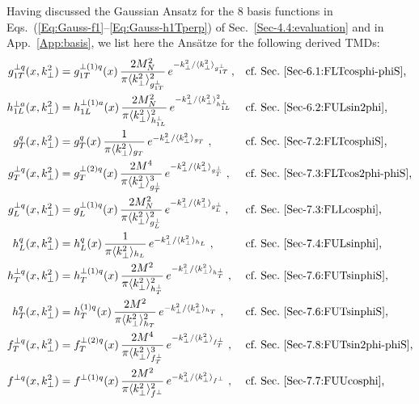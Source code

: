 \documentclass[a4paper,11pt]{article}
\newcommand{\la}{\langle}
\newcommand{\ra}{\rangle}
\def\kperp{k_\perp}
\def\avkperp{\la \kperp^2 \ra}
\begin{document}
Having discussed the Gaussian Ansatz for the 8 basis functions
in Eqs.~(\ref{Eq:Gauss-f1}--\ref{Eq:Gauss-h1Tperp}) of
Sec.~\ref{Sec-4.4:evaluation} and in App.~\ref{App:basis},
we list here the Ans\"atze for the following derived TMDs:
\begin{subequations}\begin{align}
	g_{1T}^{\perp q}(x,\kperp^2)
	  &=	g_{1T}^{\perp (1) q}(x)\,
		\frac{2 M_N^2}{\pi \avkperp_{g_{1T}^\perp}^2}\,
		e^{-\kperp^2/{\avkperp_{g_{1T}^\perp}}}  \,,
	  && 	\mbox{cf.\ Sec.~\ref{Sec-6.1:FLTcosphi-phiS},}
		\label{eq:g1t}\\
	h_{1L}^{\perp a}(x,\kperp^2)
	  &= 	h_{1L}^{\perp (1) a}(x)\,
		\frac{2 M_N^2}{\pi{\avkperp_{h_{1L}^\perp}^2}}\,
		e^{-\kperp^2/{\avkperp_{h_{1L}^\perp}^2}}
	  && 	\mbox{cf.\ Sec.~\ref{Sec-6.2:FULsin2phi},}	
		\label{eq:h1l_final}\\
	g^{q}_{T}(x,\kperp^2)
	  &=	g^{q}_{T}(x)\,\frac{1}{\pi \avkperp_{g_{T}}}\,
		e^{-\kperp^2/{\avkperp_{g_{T}}}}\;,
	  && 	\mbox{cf.\ Sec.~\ref{Sec-7.2:FLTcosphiS},}	
		\label{eq:gtnew} \\
	g^{\perp q}_{T}(x,\kperp^2)
	  &= 	g^{\perp (2) q}_{T}(x)\,\frac{2 M^4}{\pi \avkperp^3_{g_{T}^{\perp} }}\,
		e^{-\kperp^2/{\avkperp_{g_{T}^{\perp} }}}\;,
	  && 	\mbox{cf.\ Sec.~\ref{Sec-7.3:FLTcos2phi-phiS},}	
		\label{eq:gtperpnew} \\
	g_{L}^{\perp q}(x,\kperp^2)
	  &=	g_{L}^{\perp (1) q}(x)\,
		\frac{2 M_N^2}{\pi \avkperp_{g_{L}^\perp}^2}\,
		e^{-\kperp^2/{\avkperp_{g_{L}^\perp}}}  \,,
	  && 	\mbox{cf.\ Sec.~\ref{Sec-7.3:FLLcosphi},}
		\label{eq:gLperp} \\
	h_L^q(x,\kperp^2)
	  &= 	h_L^q(x) \,\frac{1}{\pi \avkperp_{h_{L}}}\,
		e^{-\kperp^2/{\avkperp_{h_{L}}}}\;,
	  && 	\mbox{cf.\ Sec.~\ref{Sec-7.4:FULsinphi},}
		\label{eq:hLnew}\\
	h_T^{\perp q}(x,\kperp^2)
	  &=	h_T^{\perp (1) q}(x)\,\frac{2 M^2}{\pi \avkperp_{h_{T}^\perp}^2}\,
	  	e^{-\kperp^2/{\avkperp_{h_{T}^\perp}}}\;,
	  && 	\mbox{cf.\ Sec.~\ref{Sec-7.6:FUTsinphiS},}
		\label{eq:hTperpnew}\\
	h_T^{q}(x,\kperp^2)
	  &=	h_T^{(1) q}(x) \,\frac{2 M^2}{\pi \avkperp_{h_{T}}^2}\,
		e^{-\kperp^2/{\avkperp_{h_{T}}}}\;,
	  && 	\mbox{cf.\ Sec.~\ref{Sec-7.6:FUTsinphiS},}
		\label{eq:hTnew}\\
	f^{\perp q}_{T}(x,\kperp^2)
	  &= 	f^{\perp (2) q}_{T}(x)\,\frac{2 M^4}{\pi \avkperp^3_{f_{T}^{\perp} }}\,
		e^{-\kperp^2/{\avkperp_{f_{T}^{\perp} }}}\;,
	  && 	\mbox{cf.\ Sec.~\ref{Sec-7.8:FUTsin2phi-phiS},}
		\label{eq:ftperpnew}\\
	f^{\perp q}(x,\kperp^2)
	  &= 	f^{\perp (1) q}(x) \,\frac{2 M^2}{\pi \avkperp_{f^\perp}^2}\,
		e^{-\kperp^2/{\avkperp_{f^\perp}}}\;,
	  && 	\mbox{cf.\ Sec.~\ref{Sec-7.7:FUUcosphi},}
		\label{eq:fperpnew}
\end{align}\end{subequations}
\end{document}
